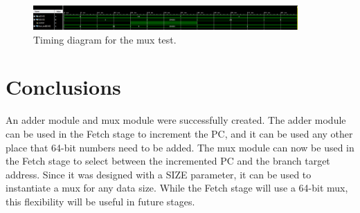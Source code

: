 \documentclass{article}
\begin{document}
\begin{figure}
	\begin{center}
		\caption{Timing diagram for the mux test.}\label{fig:muxtest}
		\includegraphics[width=0.9\textwidth]{../images/mux_test.png}
	\end{center}
\end{figure}

\section{Conclusions}
An adder module and mux module were successfully created.  The adder module can be used in the Fetch stage to increment the PC, and it can be used any other place that 64-bit numbers need to be added.  The mux module can now be used in the Fetch stage to select between the incremented PC and the branch target address.  Since it was designed with a SIZE parameter, it can be used to instantiate a mux for any data size.  While the Fetch stage will use a 64-bit mux, this flexibility will be useful in future stages.
\end{document}
